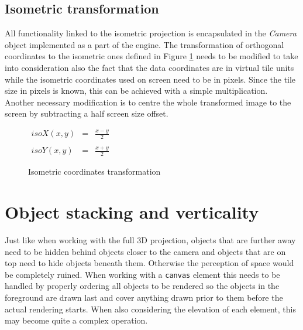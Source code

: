 \documentclass[11pt,oneside, final]{fithesis2}
\begin{document}
\subsection{Isometric transformation}
All functionality linked to the isometric projection is encapsulated in the \emph{Camera} object implemented as a part of the engine. The transformation of orthogonal coordinates to the isometric ones defined in Figure \ref{isotransformation} needs to be modified to take into consideration also the fact that the data coordinates are in virtual tile units while the isometric coordinates used on screen need to be in pixels\cite{pagella}. Since the tile size in pixels is known, this can be achieved with a simple multiplication. Another necessary modification is to centre the whole transformed image to the screen by subtracting a half screen size offset.

\begin{figure}[h]
	\centering
	\begin{math}
		\begin{array}{lcl}
			isoX(x,y)&=&\frac{x - y}{2} \\\\
			isoY(x,y)&=&\frac{x + y}{2}
		\end{array}
	\end{math}
	\caption{Isometric coordinates transformation}
	\label{isotransformation}
\end{figure}

\section{Object stacking and verticality}
Just like when working with the full 3D projection, objects that are further away need to be hidden behind objects closer to the camera and objects that are on top need to hide objects beneath them. Otherwise the perception of space would be completely ruined. When working with a \texttt{canvas} element this needs to be handled by properly ordering all objects to be rendered so the objects in the foreground are drawn last and cover anything drawn prior to them before the actual rendering starts. When also considering the elevation of each element, this may become quite a complex operation. 
\end{document}
